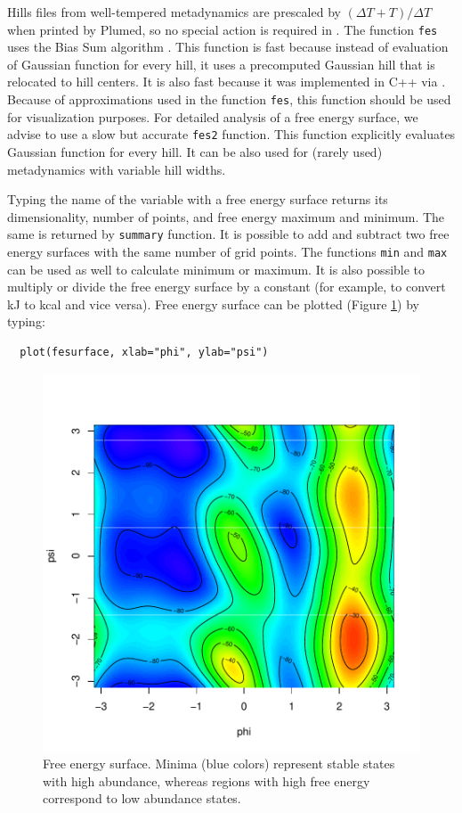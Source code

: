 Hills files from well-tempered metadynamics are prescaled by
\((\Delta T + T)/\Delta T\) when printed by Plumed, so no special action
is required in . The function \texttt{fes} uses
the Bias Sum algorithm \citep{petr}. This function is fast because
instead of evaluation of Gaussian function for every hill, it uses a
precomputed Gaussian hill that is relocated to hill centers. It is also
fast because it was implemented in C++ via . Because of
approximations used in the function \texttt{fes}, this function should
be used for visualization purposes. For detailed analysis of a free
energy surface, we advise to use a slow but accurate \texttt{fes2}
function. This function explicitly evaluates Gaussian function for every
hill. It can be also used for (rarely used) metadynamics with variable
hill widths.

Typing the name of the variable with a free energy surface returns its
dimensionality, number of points, and free energy maximum and minimum.
The same is returned by \texttt{summary} function. It is possible to add
and subtract two free energy surfaces with the same number of grid
points. The functions \texttt{min} and \texttt{max} can be used as well
to calculate minimum or maximum. It is also possible to multiply or
divide the free energy surface by a constant (for example, to convert kJ
to kcal and vice versa). Free energy surface can be plotted (Figure
\ref{fig:plotfes}) by typing:

\begin{verbatim}
  plot(fesurface, xlab="phi", ylab="psi")
\end{verbatim}

\begin{Schunk}
\begin{figure}

{\centering \includegraphics[width=0.8\linewidth]{metadynminer_files/figure-latex/plotfes-1} 

}

\caption[Free energy surface]{Free energy surface. Minima (blue colors) represent stable states with high abundance, whereas regions with high free energy correspond to low abundance states.}\label{fig:plotfes}
\end{figure}
\end{Schunk}

